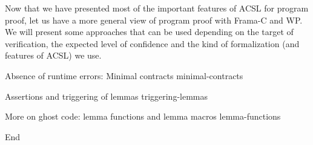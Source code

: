 Now that we have presented most of the important features of ACSL for program
proof, let us have a more general view of program proof with Frama-C and WP. We
will present some approaches that can be used depending on the target of
verification, the expected level of confidence and the kind of formalization
(and features of ACSL) we use.



\begin{levelTwo}
  {Absence of runtime errors: Minimal contracts}
  {minimal-contracts}
\end{levelTwo}

\begin{levelTwo}
  {Assertions and triggering of lemmas}
  {triggering-lemmas}
\end{levelTwo}

\begin{levelTwo}
  {More on ghost code: lemma functions and lemma macros}
  {lemma-functions}
\end{levelTwo}



\horizontalLine
\newpage

End

